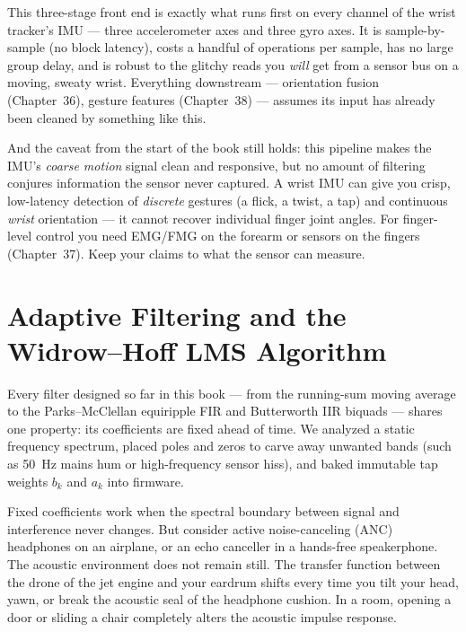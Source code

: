 \begin{goalbox}
This three-stage front end is exactly what runs first on every channel of the
wrist tracker's IMU --- three accelerometer axes and three gyro axes. It is
sample-by-sample (no block latency), costs a handful of operations per sample,
has no large group delay, and is robust to the glitchy reads you \emph{will} get
from a sensor bus on a moving, sweaty wrist. Everything downstream --- orientation
fusion (Chapter~36), gesture features (Chapter~38) --- assumes its input has
already been cleaned by something like this.

And the caveat from the start of the book still holds: this pipeline
makes the IMU's \emph{coarse motion} signal clean and responsive, but no amount
of filtering conjures information the sensor never captured. A wrist IMU can give
you crisp, low-latency detection of \emph{discrete} gestures (a flick, a twist, a
tap) and continuous \emph{wrist} orientation --- it cannot recover individual
finger joint angles. For finger-level control you need EMG/FMG on the forearm or
sensors on the fingers (Chapter~37). Keep your claims to what the sensor can
measure.
\end{goalbox}

\section{Adaptive Filtering and the Widrow--Hoff LMS Algorithm}
\label{ch17:adaptive-lms}

Every filter designed so far in this book --- from the running-sum moving average to the Parks--McClellan equiripple FIR and Butterworth IIR biquads --- shares one property: its coefficients are fixed ahead of time. We analyzed a static frequency spectrum, placed poles and zeros to carve away unwanted bands (such as 50~Hz mains hum or high-frequency sensor hiss), and baked immutable tap weights $b_k$ and $a_k$ into firmware.

Fixed coefficients work when the spectral boundary between signal and interference never changes. But consider active noise-canceling (ANC) headphones on an airplane, or an echo canceller in a hands-free speakerphone. The acoustic environment does not remain still. The transfer function between the drone of the jet engine and your eardrum shifts every time you tilt your head, yawn, or break the acoustic seal of the headphone cushion. In a room, opening a door or sliding a chair completely alters the acoustic impulse response.

